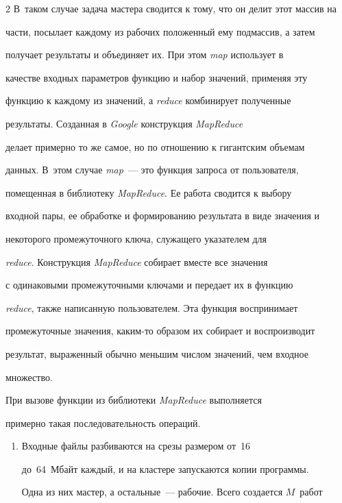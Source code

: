 \begin{multicols}{2}
В~таком случае задача мастера сводится к тому, что он делит этот массив на 


части, посылает каждому из рабочих положенный ему подмассив, а затем 


получает результаты и объединяет их. При этом \textit{map} использует в 


качестве входных параметров функцию и набор значений, применяя эту 


функцию к каждому из значений, а \textit{reduce} комбинирует полученные 


результаты. Созданная в \textit{Google} конструкция \textit{MapReduce} 


делает примерно то же самое, но по отношению к гигантским объемам 


данных. В~этом случае \textit{map}~--- это функция запроса от пользователя, 


помещенная в библиотеку \textit{MapReduce}. Ее работа сводится к выбору 


входной пары, ее обработке и формированию результата в виде значения и 


некоторого промежуточного ключа, служащего указателем для 


\textit{reduce}. Конструкция \textit{MapReduce} собирает вместе все значения 


с одинаковыми промежуточными ключами и передает их в функцию 


\textit{reduce}, также написанную пользователем. Эта функция воспринимает 


промежуточные значения, каким-то образом их собирает и воспроизводит 


результат, выраженный обычно меньшим числом значений, чем входное 


множество.


      


      При вызове функции из библиотеки \textit{MapReduce} выполняется 


примерно такая последовательность операций.


\begin{enumerate}[1.]


\item Входные файлы разбиваются на срезы размером от~16 


до~64~Мбайт каждый, и на кластере запускаются копии программы. 


Одна из них мастер, а остальные~--- рабочие. Всего создается $M$~работ 



\end{enumerate}
\end{multicols}
